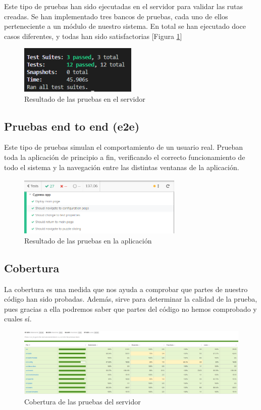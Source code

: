 Este tipo de pruebas han sido ejecutadas en el servidor para validar las rutas creadas. Se han implementado tres bancos de pruebas, cada uno de ellos perteneciente a un módulo de nuestro sistema. En total se han ejecutado doce casos diferentes, y todas han sido satisfactorias [Figura \ref{fig:test_suite_server}]

\begin{figure}[H]
    \centering
    \includegraphics[width=0.5\textwidth]{imaxes/test_suites_server.png}
    \caption{Resultado de las pruebas en el servidor}
    \label{fig:test_suite_server}
\end{figure}

\subsection{Pruebas end to end (e2e)}
Este tipo de pruebas simulan el comportamiento de un usuario real. Prueban toda la aplicación de principio a fin, verificando el correcto funcionamiento de todo el sistema y la navegación entre las distintas ventanas de la aplicación.

\begin{figure}[H]
    \centering
    \includegraphics[width=0.7\textwidth]{imaxes/test_suites_app.png}
    \caption[Resultado de las pruebas en la aplicación]{Resultado de las pruebas en la aplicación \cite{cypress_youtube}}
    \label{fig:test_suite_app}
\end{figure}

\subsection{Cobertura}

La cobertura es una medida que nos ayuda a comprobar que partes de nuestro código han sido probadas. Además, sirve para determinar la calidad de la prueba, pues gracias a ella podremos saber que partes del código no hemos comprobado y cuales sí.

\begin{landscape}
    \begin{figure}
        \centering
        
        \includegraphics[width=\linewidth,height=0.6\textheight]{imaxes/server_coverage.png}
        \caption{Cobertura de las pruebas del servidor}
        \label{fig:server_coverage}
    \end{figure}
\end{landscape}

